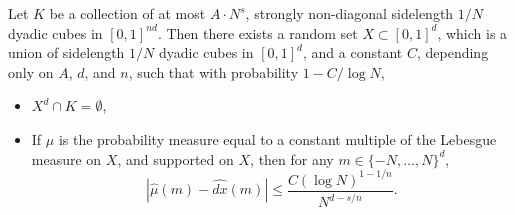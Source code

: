 \begin{theorem}
	Let $K$ be a collection of at most $A \cdot N^s$, strongly non-diagonal sidelength $1/N$ dyadic cubes in $[0,1]^{nd}$. Then there exists a random set $X \subset [0,1]^d$, which is a union of sidelength $1/N$ dyadic cubes in $[0,1]^d$, and a constant $C$, depending only on $A$, $d$, and $n$, such that with probability $1 - C/\log N$,
	\begin{itemize}
		\item $X^d \cap K = \emptyset$,
		\item If $\mu$ is the probability measure equal to a constant multiple of the Lebesgue measure on $X$, and supported on $X$, then for any $m \in \{ -N, \dots, N \}^d$,
		\[ |\widehat{\mu}(m) - \widehat{dx}(m)| \leq \frac{C (\log N)^{1 - 1/n}}{N^{d-s/n}}. \]
	\end{itemize}
\end{theorem}
